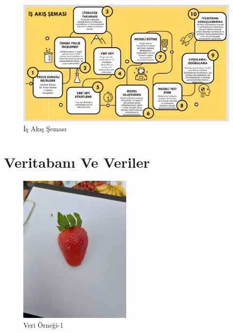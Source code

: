 \documentclass[11pt,a4paper]{report}
\begin{document}
\begin{enumerate}
\begin{landscape}
\begin{figure}[!h]
     		\end{figure}
     	\end{landscape}
     	
     	\begin{landscape}
     		\begin{figure}[!h]
     			
     			\raggedright
     			\includegraphics[height=1.04\textheight]{İş Akış Şeması}
     			\caption{İş Akış Şeması}
     			
     		\end{figure}
     	\end{landscape}
    \end{enumerate}
    \newpage
    
	\section{Veritabanı Ve Veriler}
	
	\begin{figure}[!h]
		
		\centering
		\includegraphics[angle=-90,width=0.5\textwidth]{resim1}
		\caption{Veri Örneği-1}
		
	\end{figure}
	
\end{document}

